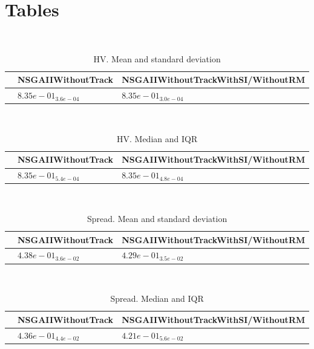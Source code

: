 \documentclass{article}
\title{}
\author{}
\begin{document}
\maketitle
\section{Tables}
\
\begin{table}
\caption{HV. Mean and standard deviation}
\label{table:mean.HV}
\centering
\begin{scriptsize}
\begin{tabular}{lll}
\hline & NSGAIIWithoutTrack &  NSGAIIWithoutTrackWithSI/WithoutRM\\
\hline
 & \cellcolor{gray25}$  8.35e-01_{ 3.6e-04}$ & \cellcolor{gray95}$  8.35e-01_{ 3.0e-04}$ \\
\hline
\end{tabular}
\end{scriptsize}
\end{table}
\
\begin{table}
\caption{HV. Median and IQR}
\label{table:median.HV}
\begin{scriptsize}
\centering
\begin{tabular}{lll}
\hline & NSGAIIWithoutTrack &  NSGAIIWithoutTrackWithSI/WithoutRM\\
\hline
 & \cellcolor{gray25}$  8.35e-01_{ 5.4e-04}$ & \cellcolor{gray95}$  8.35e-01_{ 4.8e-04}$ \\
\hline
\end{tabular}
\end{scriptsize}
\end{table}
\
\begin{table}
\caption{Spread. Mean and standard deviation}
\label{table:mean.Spread}
\centering
\begin{scriptsize}
\begin{tabular}{lll}
\hline & NSGAIIWithoutTrack &  NSGAIIWithoutTrackWithSI/WithoutRM\\
\hline
 & \cellcolor{gray25}$  4.38e-01_{ 3.6e-02}$ & \cellcolor{gray95}$  4.29e-01_{ 3.5e-02}$ \\
\hline
\end{tabular}
\end{scriptsize}
\end{table}
\
\begin{table}
\caption{Spread. Median and IQR}
\label{table:median.Spread}
\begin{scriptsize}
\centering
\begin{tabular}{lll}
\hline & NSGAIIWithoutTrack &  NSGAIIWithoutTrackWithSI/WithoutRM\\
\hline
 & \cellcolor{gray25}$  4.36e-01_{ 4.4e-02}$ & \cellcolor{gray95}$  4.21e-01_{ 5.6e-02}$ \\
\hline
\end{tabular}
\end{scriptsize}
\end{table}
\end{document}
